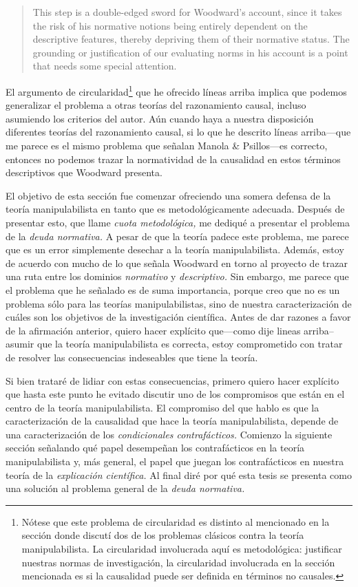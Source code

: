 {{\begin{quote}
  This step is a double-edged sword for Woodward’s account,
  since it takes the risk of his normative notions being
  entirely dependent on the descriptive features, thereby
  depriving them of their normative status. The grounding or
  justification of our evaluating norms in his account is a
  point that needs some special attention.
\end{quote}

El argumento de circularidad\footnote{
  Nótese que este problema de circularidad es distinto al
  mencionado en la sección donde discutí dos de los
  problemas clásicos contra la teoría manipulabilista. La
  circularidad involucrada aquí es metodológica: justificar
  nuestras normas de  investigación, la circularidad
  involucrada en la sección mencionada es si la causalidad
  puede ser definida en términos no causales.
}
que he ofrecido líneas arriba implica que podemos
generalizar el problema a otras teorías del razonamiento
causal, incluso asumiendo los criterios del autor. Aún
cuando haya a nuestra disposición diferentes teorías del
razonamiento causal, si lo que he descrito líneas
arriba---que me parece es el mismo problema que señalan
Manola \& Psillos---es correcto, entonces no podemos trazar
la normatividad de la causalidad en estos términos
descriptivos que Woodward presenta.

El objetivo de esta sección fue comenzar ofreciendo una
somera defensa de la teoría manipulabilista en tanto que es
metodológicamente adecuada. Después de presentar esto, que
llame \emph{cuota metodológica,} me dediqué a presentar el
problema de la \emph{deuda normativa.} A pesar de que la
teoría padece este problema, me parece que es un error
simplemente desechar a la teoría manipulabilista. Además,
estoy de acuerdo con mucho de lo que señala Woodward en
torno al proyecto de trazar una ruta entre los dominios
\emph{normativo} y \emph{descriptivo.} Sin embargo, me
parece que el problema que he señalado es de suma
importancia, porque creo que no es un problema sólo para las
teorías manipulabilistas, sino de nuestra caracterización
de cuáles son los objetivos de la investigación científica.
Antes de dar razones a favor de la afirmación anterior,
quiero hacer explícito que---como dije lineas
arriba--asumir que la teoría manipulabilista es correcta,
estoy comprometido con tratar de resolver las consecuencias
indeseables que tiene la teoría.

Si bien trataré de lidiar con estas consecuencias, primero
quiero hacer explícito que hasta este punto he evitado
discutir uno de los compromisos que están en el centro de la
teoría manipulabilista. El compromiso del que hablo es que
la caracterización de la causalidad que hace la teoría
manipulabilista, depende de una caracterización de los
\emph{condicionales contrafácticos.} Comienzo la siguiente
sección señalando qué papel desempeñan los contrafácticos en
la teoría manipulabilista y, más general, el papel que
juegan los contrafácticos en nuestra teoría de la
\emph{explicación científica.} Al final diré por qué esta
tesis se presenta como una solución al problema general de
la \emph{deuda normativa.}


}}
